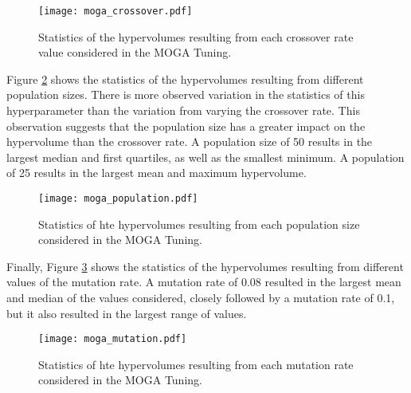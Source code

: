 \begin{figure}
    \centering 
    \texttt{[image: moga\_crossover.pdf]}
    \caption{Statistics of the hypervolumes resulting from each 
    crossover rate value considered in the MOGA Tuning.}
    \label{fig:moga_crossover}
\end{figure}

Figure \ref{fig:moga_population} shows the statistics of the hypervolumes 
resulting from different population sizes. There is more observed variation 
in the statistics of this hyperparameter than the variation from varying 
the crossover rate. This observation suggests that the population size has 
a greater impact on the hypervolume than the crossover rate. A population 
size of 50 results in the largest median and first quartiles, as well 
as the smallest minimum. A population of 25 results in the largest mean 
and maximum hypervolume. 

\begin{figure}
    \centering 
    \texttt{[image: moga\_population.pdf]}
    \caption{Statistics of hte hypervolumes resulting from 
    each population size considered in the MOGA Tuning.}
    \label{fig:moga_population}
\end{figure}

Finally, Figure \ref{fig:moga_mutation} shows the statistics of the 
hypervolumes resulting from different values of the mutation rate.
A mutation rate of 0.08 resulted in the largest mean and median of the 
values considered, closely followed by a mutation rate of 0.1, but it 
also resulted in the largest range of values. 


\begin{figure}
    \centering 
    \texttt{[image: moga\_mutation.pdf]}
    \caption{Statistics of hte hypervolumes resulting from 
    each mutation rate considered in the MOGA Tuning.}
    \label{fig:moga_mutation}
\end{figure}

